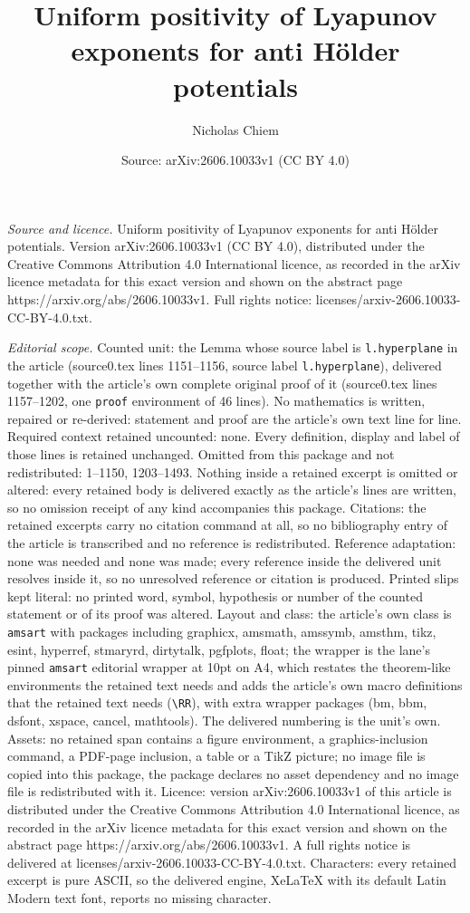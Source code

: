\documentclass[10pt,a4paper]{amsart}
\title[Uniform positivity of Lyapunov exponents for anti H\"older p]{Uniform positivity of Lyapunov exponents for anti H\"older potentials}
\author{Nicholas Chiem}
\date{Source: arXiv:2606.10033v1 (CC BY 4.0)}
\begin{document}
\maketitle

\noindent\emph{Source and licence.} Uniform positivity of Lyapunov exponents for anti H\"older potentials. Version arXiv:2606.10033v1 (CC BY 4.0), distributed under the Creative Commons Attribution 4.0 International licence, as recorded in the arXiv licence metadata for this exact version and shown on the abstract page https://arxiv.org/abs/2606.10033v1. Full rights notice: licenses/arxiv-2606.10033-CC-BY-4.0.txt.\par\smallskip

\noindent\textit{Editorial scope.} Counted unit: the Lemma whose source label is \texttt{l.hyperplane} in the article (source0.tex lines 1151--1156, source label \texttt{l.hyperplane}), delivered together with the article's own complete original proof of it (source0.tex lines 1157--1202, one \texttt{proof} environment of 46 lines). No mathematics is written, repaired or re-derived: statement and proof are the article's own text line for line. Required context retained uncounted: none. Every definition, display and label of those lines is retained unchanged. Omitted from this package and not redistributed: 1--1150, 1203--1493. Nothing inside a retained excerpt is omitted or altered: every retained body is delivered exactly as the article's lines are written, so no omission receipt of any kind accompanies this package. Citations: the retained excerpts carry no citation command at all, so no bibliography entry of the article is transcribed and no reference is redistributed. Reference adaptation: none was needed and none was made; every reference inside the delivered unit resolves inside it, so no unresolved reference or citation is produced. Printed slips kept literal: no printed word, symbol, hypothesis or number of the counted statement or of its proof was altered. Layout and class: the article's own class is \texttt{amsart} with packages including graphicx, amsmath, amssymb, amsthm, tikz, esint, hyperref, stmaryrd, dirtytalk, pgfplots, float; the wrapper is the lane's pinned \texttt{amsart} editorial wrapper at 10pt on A4, which restates the theorem-like environments the retained text needs and adds the article's own macro definitions that the retained text needs (\texttt{\textbackslash RR}), with extra wrapper packages (bm, bbm, dsfont, xspace, cancel, mathtools). The delivered numbering is the unit's own. Assets: no retained span contains a figure environment, a graphics-inclusion command, a PDF-page inclusion, a table or a TikZ picture; no image file is copied into this package, the package declares no asset dependency and no image file is redistributed with it. Licence: version arXiv:2606.10033v1 of this article is distributed under the Creative Commons Attribution 4.0 International licence, as recorded in the arXiv licence metadata for this exact version and shown on the abstract page https://arxiv.org/abs/2606.10033v1. A full rights notice is delivered at licenses/arxiv-2606.10033-CC-BY-4.0.txt. Characters: every retained excerpt is pure ASCII, so the delivered engine, XeLaTeX with its default Latin Modern text font, reports no missing character.
\end{document}
